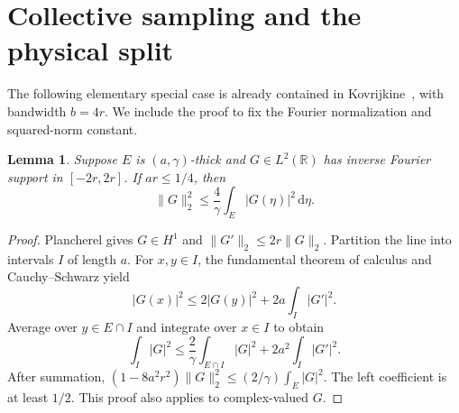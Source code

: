 \documentclass[11pt]{article}
\newtheorem{lemma}[theorem]{Lemma}
\theoremstyle{remark}\newtheorem{remark}[theorem]{Remark}
\newcommand{\R}{\mathbb R}
\newcommand{\dd}{\,\mathrm d}
\newcommand{\norm}[1]{\lVert #1\rVert}
\numberwithin{equation}{section}
\begin{document}
\section{Collective sampling and the physical split}\label{sec:sampling}
The following elementary special case is already contained in Kovrijkine~\cite[Remark~1, pp.~8--9]{Kov}, with bandwidth $b=4r$. We include the proof to fix the Fourier normalization and squared-norm constant.
\begin{lemma}\label{lem:sampling}
Suppose $E$ is $(a,\gamma)$-thick and $G\in L^2(\R)$ has inverse Fourier support in $[-2r,2r]$. If $ar\le1/4$, then
\begin{equation}\label{eq:sampling}
 \norm{G}_2^2\le\frac4\gamma\int_E|G(\eta)|^2\dd\eta.
\end{equation}
\end{lemma}
\begin{proof}
Plancherel gives $G\in H^1$ and $\norm{G'}_2\le2r\norm{G}_2$. Partition the line into intervals $I$ of length $a$. For $x,y\in I$, the fundamental theorem of calculus and Cauchy--Schwarz yield
\[
 |G(x)|^2\le2|G(y)|^2+2a\int_I|G'|^2.
\]
Average over $y\in E\cap I$ and integrate over $x\in I$ to obtain
\[
 \int_I|G|^2\le\frac2\gamma\int_{E\cap I}|G|^2
                       +2a^2\int_I|G'|^2.
\]
After summation,
$(1-8a^2r^2)\norm{G}_2^2\le(2/\gamma)\int_E|G|^2$.
The left coefficient is at least $1/2$. This proof also applies to complex-valued $G$.
\end{proof}
\end{document}
